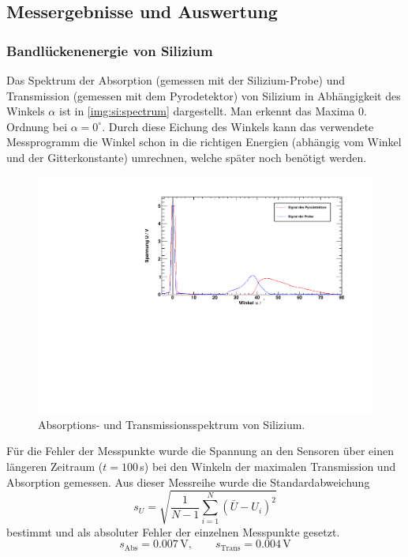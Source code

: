 \subsection{Messergebnisse und Auswertung}
\subsubsection{Bandlückenenergie von Silizium}
Das Spektrum der Absorption (gemessen mit der Silizium-Probe) und Transmission (gemessen mit dem Pyrodetektor) von Silizium 
in Abhängigkeit des Winkels $\alpha$ ist in \autoref{img:si:spectrum} dargestellt. Man erkennt das Maxima 0. Ordnung bei $\alpha = 0^\circ$. 
Durch diese Eichung des Winkels kann das verwendete Messprogramm die Winkel schon in die richtigen Energien 
(abhängig vom Winkel und der Gitterkonstante) umrechnen, welche später noch benötigt werden.
\begin{figure}[H]
\begin{center}
  \includegraphics[width=\textwidth]{../img/part1/Si_Messung_spectrum.pdf}
  \caption{Absorptions- und Transmissionsspektrum von Silizium.}
  \label{img:si:spectrum}
\end{center}
\end{figure}

Für die Fehler der Messpunkte wurde die Spannung an den Sensoren über einen längeren Zeitraum ($t=100$\,s) bei den Winkeln der maximalen 
Transmission und Absorption gemessen. Aus dieser Messreihe wurde die Standardabweichung
\begin{equation}
  s_U = \sqrt{ \frac{1}{N - 1} \sum_{i=1}^N \left( \bar{U} - U_i \right)^2 }
\end{equation}
bestimmt und als absoluter Fehler der einzelnen Messpunkte gesetzt.
\begin{equation}
  s_{\text{Abs}} = 0.007\,\text{V}, \qquad s_{\text{Trans}} = 0.004\,\text{V}
\end{equation}

